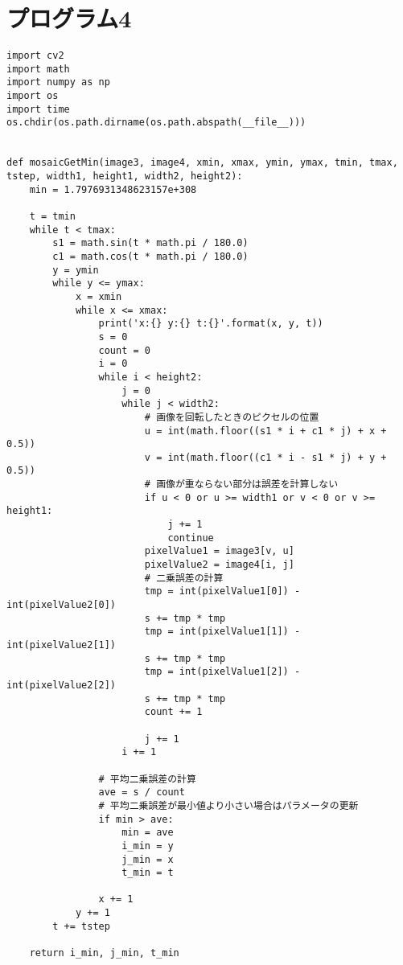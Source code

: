 \section{プログラム4}
\begin{lstlisting}[caption=サンプルプログラム（Python）]
import cv2
import math
import numpy as np
import os
import time
os.chdir(os.path.dirname(os.path.abspath(__file__)))


def mosaicGetMin(image3, image4, xmin, xmax, ymin, ymax, tmin, tmax, tstep, width1, height1, width2, height2):
    min = 1.7976931348623157e+308

    t = tmin
    while t < tmax:
        s1 = math.sin(t * math.pi / 180.0)
        c1 = math.cos(t * math.pi / 180.0)
        y = ymin
        while y <= ymax:
            x = xmin
            while x <= xmax:
                print('x:{} y:{} t:{}'.format(x, y, t))
                s = 0
                count = 0
                i = 0
                while i < height2:
                    j = 0
                    while j < width2:
                        # 画像を回転したときのピクセルの位置
                        u = int(math.floor((s1 * i + c1 * j) + x + 0.5))
                        v = int(math.floor((c1 * i - s1 * j) + y + 0.5))
                        # 画像が重ならない部分は誤差を計算しない
                        if u < 0 or u >= width1 or v < 0 or v >= height1:
                            j += 1
                            continue
                        pixelValue1 = image3[v, u]
                        pixelValue2 = image4[i, j]
                        # 二乗誤差の計算
                        tmp = int(pixelValue1[0]) - int(pixelValue2[0])
                        s += tmp * tmp
                        tmp = int(pixelValue1[1]) - int(pixelValue2[1])
                        s += tmp * tmp
                        tmp = int(pixelValue1[2]) - int(pixelValue2[2])
                        s += tmp * tmp
                        count += 1

                        j += 1
                    i += 1

                # 平均二乗誤差の計算
                ave = s / count
                # 平均二乗誤差が最小値より小さい場合はパラメータの更新
                if min > ave:
                    min = ave
                    i_min = y
                    j_min = x
                    t_min = t

                x += 1
            y += 1
        t += tstep
    
    return i_min, j_min, t_min



\end{lstlisting}
